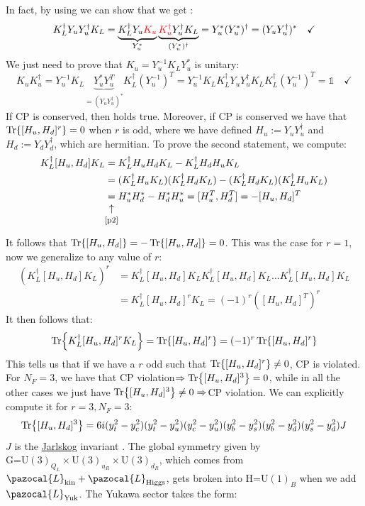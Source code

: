 \documentclass[../main.tex]{subfiles}
\begin{document}
In fact, by using  we can show that we get :
\[
K_L^\dagger Y_uY_u^\dagger K_L=\underbrace{K_L^\dagger Y_u{\color{red}K_u}}_{Y_u^*}\underbrace{{\color{red}K_u^\dagger}Y_u^\dagger K_L}_{(Y_u^*)^\dagger}=Y_u^*(Y_u^*)^\dagger=(Y_uY_u^\dagger)^* \quad \checkmark
\]
We just need to prove that $K_u=Y_u^{-1}K_LY_u^*$ is unitary:
\[
K_uK_u^\dagger=Y_u^{-1}K_L\underbrace{Y_u^*Y_u^T}_{=(Y_uY_u^\dagger)^*}K_L^\dagger(Y_u^{-1})^T=Y_u^{-1}K_LK_L^\dagger Y_uY_u^\dagger K_LK_L^\dagger(Y_u^{-1})^T=\mathbb{1} \quad \checkmark
\]
If CP is conserved, then  holds true. Moreover, if CP is conserved we have that $\Tr{[H_u,H_d]^r}=0$ when $r$ is odd, where we have defined $H_u:=Y_uY_u^\dagger$ and $H_d:=Y_dY_d^\dagger$, which are hermitian. To prove the second statement, we compute:
\begin{align*}
K_L^\dagger[H_u,H_d]K_L&=K_L^\dagger H_uH_dK_L-K_L^\dagger H_dH_uK_L\\
&=(K_L^\dagger H_uK_L)(K_L^\dagger H_dK_L)-(K_L^\dagger H_dK_L)(K_L^\dagger H_uK_L)\\
&\underset{\mathclap{\tikz \node {$\uparrow$} node [below=1ex] {\footnotesize \refeq{p2} };}}{=}H_u^*H_d^*-H_d^*H_u^*=[H_u^T,H_d^T]=-[H_u,H_d]^T
\end{align*}
It follows that $\Tr{[H_u,H_d]}=-\Tr{[H_u,H_d]}=0$. This was the case for $r=1$, now we generalize to any value of $r$:
\begin{align*}
\left(K_L^\dagger[H_u,H_d]K_L\right)^r&=K_L^\dagger[H_u,H_d]K_LK_L^\dagger[H_u,H_d]K_L\dots K_L^\dagger[H_u,H_d]K_L\\
&=K_L^\dagger[H_u,H_d]^rK_L=(-1)^r\left([H_u,H_d]^T\right)^r
\end{align*}
It then follows that: 
\[
\Tr{K_L^\dagger[H_u,H_d]^rK_L}=\Tr{[H_u,H_d]^r}=(-1)^r\Tr{[H_u,H_d]^r}
\]
This tells us that if we have a $r$ odd such that $\Tr{[H_u,H_d]^r}\neq0$, CP is violated. For $N_F=3$, we have that CP violation$\Rightarrow\Tr{[H_u,H_d]^3}=0$, while in all the other cases we just have $\Tr{[H_u,H_d]^3}\neq0\Rightarrow$CP violation. We can explicitly compute it for $r=3, N_F=3$:
\[
\Tr{[H_u,H_d]^3}=6i(y_t^2-y_c^2)(y_t^2-y_u^2)(y_c^2-y_u^2)(y_b^2-y_s^2)(y_b^2-y_d^2)(y_s^2-y_d^2)J
\]
$J$ is the \href{https://en.wikipedia.org/wiki/Cecilia_Jarlskog}{Jarlskog} invariant
. The global symmetry given by\\
G=U$(3)_{Q_L}\times$U$(3)_{u_R}\times$U$(3)_{d_R}$, which comes from $\pazocal{L}_{\text{kin}}+\pazocal{L}_{\text{Higgs}}$, gets broken into H=U$(1)_B$ when we add $\pazocal{L}_{\text{Yuk}}$. The Yukawa sector takes the form:
\end{document}
